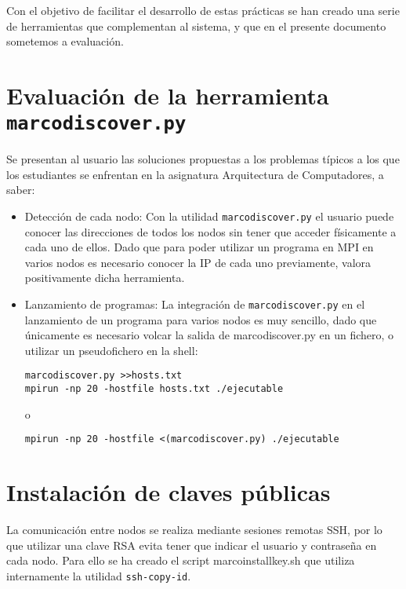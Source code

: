 Con el objetivo de facilitar el desarrollo de estas prácticas se han creado una serie de herramientas que complementan al sistema, y que en el presente documento sometemos a evaluación.



\section{Evaluación de la herramienta \texttt{marcodiscover.py}}

Se presentan al usuario las soluciones propuestas a los problemas típicos a los que los estudiantes se enfrentan en la asignatura Arquitectura de Computadores, a saber:

\begin{itemize}

\item Detección de cada nodo: Con la utilidad \texttt{marcodiscover.py} el usuario puede conocer las direcciones de todos los nodos sin tener que acceder físicamente a cada uno de ellos. Dado que para poder utilizar un programa en MPI en varios nodos es necesario conocer la IP de cada uno previamente, valora positivamente dicha herramienta.

\item Lanzamiento de programas: La integración de \texttt{marcodiscover.py} en el lanzamiento de un programa para varios nodos es muy sencillo, dado que únicamente es necesario volcar la salida de marcodiscover.py en un fichero, o utilizar un pseudofichero en la shell:

\texttt{marcodiscover.py >\textgreater hosts.txt\\
mpirun -np 20 -hostfile hosts.txt ./ejecutable}

o 

\texttt{mpirun -np 20 -hostfile <(marcodiscover.py) ./ejecutable}

\end{itemize}


\section{Instalación de claves públicas}

La comunicación entre nodos se realiza mediante sesiones remotas SSH, por lo que utilizar una clave RSA evita tener que indicar el usuario y contraseña en cada nodo. Para ello se ha creado el script marcoinstallkey.sh que utiliza internamente la utilidad \texttt{ssh-copy-id}.


